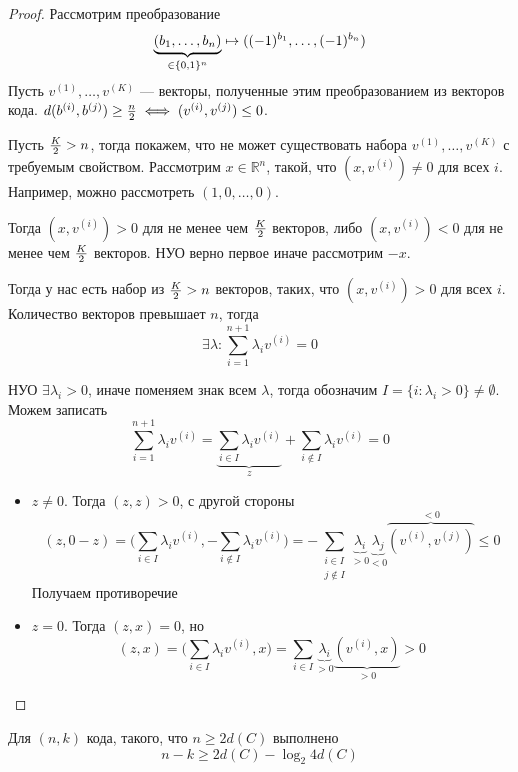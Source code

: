 \begin{proof}
Рассмотрим преобразование 
$$\underbrace{(b_1, \ldots, b_n)}_{\in \{0,1\}^n} \mapsto ((-1)^{b_1}, \ldots, (-1)^{b_n})$$
Пусть $v^{(1)}, \ldots, v^{(K)}$ --- векторы, полученные этим преобразованием
из векторов кода. $d(b^{(i)}, b^{(j)}) \ge {n \over 2} \iff (v^{(i)}, v^{(j)}) \le 0$.

Пусть ${K \over 2} > n$, тогда покажем, что не может существовать набора 
$v^{(1)}, \ldots, v^{(K)}$ с требуемым свойством. Рассмотрим $x \in \mathbb{R}^n$,
такой, что $(x, v^{(i)}) \neq 0$ для всех $i$. Например, можно рассмотреть 
$(1,0,\ldots,0)$.

Тогда $(x,v^{(i)}) > 0$ для не менее чем ${K \over 2}$ векторов, либо
$(x,v^{(i)}) < 0$ для не менее чем ${K \over 2}$ векторов. НУО верно 
первое иначе рассмотрим $-x$.

Тогда у нас есть набор из ${K \over 2} > n$ векторов, таких, что
$(x, v^{(i)}) > 0$ для всех $i$. Количество векторов превышает $n$, 
тогда $$\exists \lambda \colon \sum\limits_{i=1}^{n+1} \lambda_i v^{(i)} = 0$$

НУО $\exists \lambda_i > 0$, иначе поменяем знак всем $\lambda$, тогда
обозначим $I = \{i \colon \lambda_i > 0\} \neq \emptyset$. Можем записать
$$\sum\limits_{i=1}^{n+1} \lambda_i v^{(i)} = 
\underbrace{\sum\limits_{i \in I} \lambda_i v^{(i)}}_{z} +
\sum\limits_{i \not\in I} \lambda_i v^{(i)} = 0$$

\begin{itemize}
\item $z \neq 0$. Тогда $(z,z) > 0$, с другой стороны
      $$(z, 0 - z) = \Big(\sum\limits_{i \in I} \lambda_i v^{(i)}, 
      -\sum\limits_{i \not\in I} \lambda_i v^{(i)}\Big) =
        - \sum\limits_{\substack{i \in I \\ j \not\in I}} 
     \underbrace{\lambda_i}_{>0} \underbrace{\lambda_j}_{<0} 
       \overbrace{(v^{(i)}, v^{(j)})}^{<0} \le 0$$
    Получаем противоречие
\item $z=0$. Тогда $(z,x) = 0$, но
   $$(z,x) = \Big(\sum\limits_{i \in I} \lambda_i v^{(i)}, x\Big) =
   \sum\limits_{i \in I} \underbrace{\lambda_i}_{>0} \underbrace{(v^{(i)}, x)}_{>0} > 0$$
\end{itemize}
\end{proof}

\begin{theorem}
Для $(n,k)$ кода, такого, что $n \ge 2 d(C)$ выполнено
  $$n -k \ge 2d(C) - \log_2 4d(C)$$
\end{theorem}

